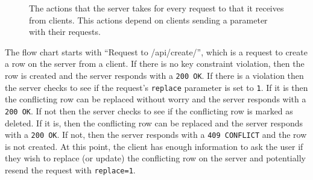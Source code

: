 \begin{figure}[h!]
\centering
{}
\caption{The actions that the server takes for every request to \create that it
receives from clients. This actions depend on clients sending a 
parameter with their requests.}
\label{fig:create}
\end{figure}

The flow chart starts with ``Request to /api/create/'', which is a request
to create a row on the server from a client. If there is no key constraint
violation, then the row is created and the server responds with a \texttt{200
OK}. If there is a violation then the server checks to see if the request's
\texttt{replace} parameter is set to \texttt{1}. If it is then the conflicting
row can be replaced without worry and the server responds with a \texttt{200
OK}.  If not then the server checks to see if the conflicting row is marked as
deleted. If it is, then the conflicting row can be replaced and the server
responds with a \texttt{200 OK}. If not, then the server responds with a
\texttt{409 CONFLICT} and the row is not created. At this point, the client has
enough information to ask the user if they wish to replace (or update) the
conflicting row on the server and potentially resend the request with
\texttt{replace=1}. 
 
